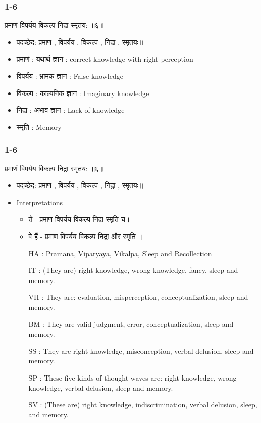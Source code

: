 \begin{frame}[fragile]\frametitle{1-6}

\begin{sanskrit}
 प्रमाणं विपर्यय विकल्प निद्रा स्मृतय: ॥६॥
\end{sanskrit}


	\begin{itemize}
	\item पदच्छेद: प्रमाण , विपर्यय , विकल्प , निद्रा , स्मृतयः॥
	\item प्रमाणं : यथार्थ ज्ञान : correct knowledge with right perception
	\item विपर्यय : भ्रामक ज्ञान : False knowledge
	\item विकल्प : काल्पनिक ज्ञान : Imaginary knowledge
	\item निद्रा : अभाव ज्ञान : Lack of knowledge
	\item स्मृति : Memory

	\end{itemize}	

\end{frame}

\begin{frame}[fragile]\frametitle{1-6}

\begin{sanskrit}
 प्रमाणं विपर्यय विकल्प निद्रा स्मृतय: ॥६॥
\end{sanskrit}


	\begin{itemize}
	\item पदच्छेद: प्रमाण , विपर्यय , विकल्प , निद्रा , स्मृतयः॥
	\item Interpretations
		\begin{itemize}	
		\item  ते - प्रमाण विपर्यय विकल्प निद्रा स्मृति च।
		\item वे हैं - प्रमाण विपर्यय विकल्प निद्रा और स्मृति ।		
		\item [HA]: Pramana, Viparyaya, Vikalpa, Sleep and Recollection
		\item [IT]: (They are) right knowledge, wrong knowledge, fancy, sleep and memory.
		\item [VH]: They are: evaluation, misperception, conceptualization, sleep and memory.
		\item [BM]: They are valid judgment, error, conceptualization, sleep and memory.
		\item [SS]: They are right knowledge, misconception, verbal delusion, sleep and memory.
		\item [SP]: These five kinds of thought-waves are: right knowledge, wrong knowledge, verbal delusion, sleep and memory.
		\item [SV]: (These are) right knowledge, indiscrimination, verbal delusion, sleep, and memory.
		\end{itemize}	
	\end{itemize}	

\end{frame}


